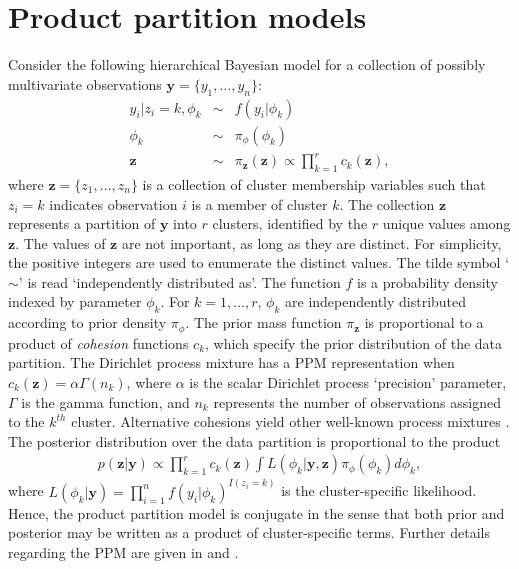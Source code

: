 \documentclass[article, nojss]{jss}
\newcommand{\bz}{\boldsymbol{z}}
\newcommand{\by}{\boldsymbol{y}}
\begin{document}
\section[PPMs]{Product partition models} \label{PPMs}
Consider the following hierarchical Bayesian model for a collection of possibly multivariate observations $\by = \{y_1, \ldots, y_n\}$:
\begin{eqnarray}
y_i | z_i = k, \phi_k & \sim & f(y_i|\phi_k) \nonumber \\
\phi_k & \sim & \pi_{\phi}(\phi_k) \nonumber \\
\bz & \sim & \pi_{\bz}(\bz) \propto \prod_{k=1}^r c_k(\bz), \nonumber
\end{eqnarray}
where $\bz = \{z_1, \ldots, z_n\}$ is a collection of cluster membership variables such that $z_i = k$ indicates observation $i$ is a member of cluster $k$. The collection $\bz$ represents a partition of $\by$ into $r$ clusters, identified by the $r$ unique values among $\bz$. The values of $\bz$ are not important, as long as they are distinct. For simplicity, the positive integers are used to enumerate the distinct values. The tilde symbol `$\sim$' is read `independently distributed as'. The function $f$ is a probability density indexed by parameter $\phi_k$. For $k = 1,\ldots,r$, $\phi_k$ are independently distributed according to prior density $\pi_{\phi}$. The prior mass function $\pi_{\bz}$ is proportional to a product of {\it cohesion} functions $c_k$, which specify the prior distribution of the data partition. The Dirichlet process mixture has a PPM representation when $c_k(\bz) = \alpha\Gamma(n_k)$, where $\alpha$ is the scalar Dirichlet process `precision' parameter, $\Gamma$ is the gamma function, and $n_k$ represents the number of observations assigned to the $k^{th}$ cluster. Alternative cohesions yield other well-known process mixtures \citep[for a partial listing, see][]{LauGreen2007}. The posterior distribution over the data partition is proportional to the product
\begin{eqnarray}
p(\bz|\by) \propto \prod_{k=1}^r c_k(\bz) \int L(\phi_k|\by,\bz) \pi_{\phi}(\phi_k) d\phi_k , \label{eqn:posterior}
\end{eqnarray}
where $L(\phi_k|\by) = \prod_{i=1}^n f(y_i|\phi_k)^{I(z_i=k)}$ is the cluster-specific likelihood. Hence, the product partition model is conjugate in the sense that both prior and posterior may be written as a product of cluster-specific terms. Further details regarding the PPM are given in \citet{Hartigan1990} and \citet{BarryHartigan1992}.
\end{document}
